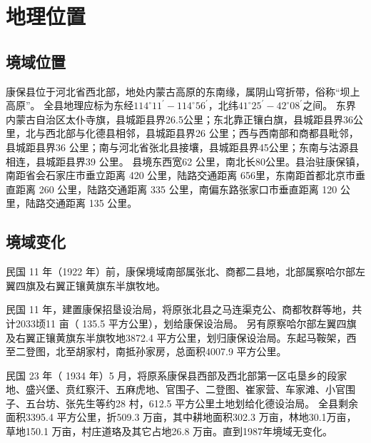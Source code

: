 \chapter{地理位置}
\section{境域位置}
康保县位于河北省西北部，地处内蒙古高原的东南缘，属阴山穹折带，俗称“坝上高原”。
全县地理应标为东经$114^{\circ}11^{\prime}-114^{\circ}56^{\prime}$，北纬$41^{\circ}25^{\prime}-42^{\circ}08^{\prime}$之间。
东界内蒙古自治区太仆寺旗，县城距县界26.5公里；东北靠正镶白旗，县城距县界36公里，北与西北部与化德县相邻，县城距县界26 公里；西与西南部和商都县毗邻，县城距县界36 公里；南与河北省张北县接壤，县城距县界45公里；东南与沽源县相连，县城距县界39 公里。
县境东西宽62 公里，南北长80公里。县治驻康保镇，南距省会石家庄市垂立距离 420 公里，陆路交通距离 656里，东南距首都北京市垂直距离 260 公里，陆路交通距离 335 公里，南偏东路张家口市垂直距离 120 公里，陆路交通距离 135 公里。
\section{境域变化}
民国 11 年（1922 年）前，康保境域南部属张北、商都二县地，北部属察哈尔部左翼四旗及右翼正镶黄旗东半旗牧地。

民国 11 年，建置康保招垦设治局，将原张北县之马连渠克公、商都牧群等地，共计2033顷11 亩（ 135.5 平方公里），划给康保设治局。
另有原察哈尔部左翼四旗及右翼正镶黄旗东半旗牧地3872.4 平方公里，划归康保设治局。东起马鞍架，西至二登图，北至胡家村，南抵孙家房，总面积4007.9 平方公里。

民国 23 年（ 1934 年）5 月，将原系康保县西部及西北部第一区屯垦乡的段家地、盛兴堡、贲红察汗、五麻虎地、官围子、二登图、崔家营、车家滩、小官围子、五台坊、张先生等约28 村，612.5 平方公里土地划给化德设治局。
全县剩余面积3395.4 平方公里，折509.3 万亩，其中耕地面积302.3 万亩，林地30.1万亩，草地150.1 万亩，村庄道珞及其它占地26.8 万亩。直到1987年境域无变化。

